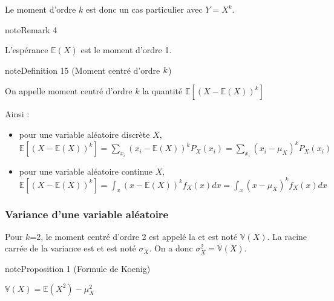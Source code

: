 \documentclass[letterpaper,10pt,english]{jupyterBook}
\begin{document}
\sphinxAtStartPar
Le moment d’ordre \(k\) est donc un cas particulier avec \(Y=X^k\).
\label{Rappels:remark-30}
\begin{sphinxadmonition}{note}{Remark 4}



\sphinxAtStartPar
L’espérance \(\mathbb{E}(X)\) est le moment d’ordre 1.
\end{sphinxadmonition}

\ignorespaces \label{Rappels:definition-31}
\begin{sphinxadmonition}{note}{Definition 15 (Moment centré d’ordre \protect\(k\protect\))}



\sphinxAtStartPar
On appelle moment centré d’ordre \(k\) la quantité \(\mathbb{E}\left [(X-\mathbb{E}(X))^k \right]\)
\end{sphinxadmonition}

\sphinxAtStartPar
Ainsi :
\begin{itemize}
\item {} 
\sphinxAtStartPar
pour une variable aléatoire discrète \(X\), \(\mathbb{E}\left [(X-\mathbb{E}(X))^k \right] = \displaystyle\sum_{x_i} (x_i-\mathbb{E}(X))^k P_X(x_i) = \displaystyle\sum_{x_i} (x_i-\mu_X)^k P_X(x_i)\)

\item {} 
\sphinxAtStartPar
pour une variable aléatoire continue \(X\), \(\mathbb{E}\left [(X-\mathbb{E}(X))^k \right] = \int_x (x-\mathbb{E}(X))^k f_X(x)dx = \int_x (x-\mu_X)^k f_X(x)dx\)

\end{itemize}


\subsubsection{Variance d’une variable aléatoire}
\label{\detokenize{Rappels:variance-d-une-variable-aleatoire}}
\ignorespaces 
{}\ignorespaces 
\sphinxAtStartPar
Pour \(k\)=2, le moment centré d’ordre 2 est appelé la  et est noté \(\mathbb{V}(X)\). La racine carrée de la variance est  et est noté \(\sigma_X\). On a donc \(\sigma_X^2=\mathbb{V}(X)\).
\label{Rappels:proposition-32}
\begin{sphinxadmonition}{note}{Proposition 1 (Formule de Koenig)}



\sphinxAtStartPar
\(\mathbb{V}(X) = \mathbb{E}(X^2)-\mu_X^2\)
\end{sphinxadmonition}
\end{document}
